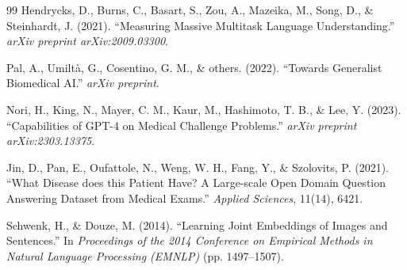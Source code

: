 \documentclass[11pt,a4paper]{article}
\begin{document}
\begin{thebibliography}{99}
Hendrycks, D., Burns, C., Basart, S., Zou, A., Mazeika, M., Song, D., \& Steinhardt, J. (2021). ``Measuring Massive Multitask Language Understanding.'' \textit{arXiv preprint arXiv:2009.03300}.

Pal, A., Umiltà, G., Cosentino, G. M., \& others. (2022). ``Towards Generalist Biomedical AI.'' \textit{arXiv preprint}.

Nori, H., King, N., Mayer, C. M., Kaur, M., Hashimoto, T. B., \& Lee, Y. (2023). ``Capabilities of GPT-4 on Medical Challenge Problems.'' \textit{arXiv preprint arXiv:2303.13375}.

Jin, D., Pan, E., Oufattole, N., Weng, W. H., Fang, Y., \& Szolovits, P. (2021). ``What Disease does this Patient Have? A Large-scale Open Domain Question Answering Dataset from Medical Exams.'' \textit{Applied Sciences}, 11(14), 6421.

Schwenk, H., \& Douze, M. (2014). ``Learning Joint Embeddings of Images and Sentences.'' In \textit{Proceedings of the 2014 Conference on Empirical Methods in Natural Language Processing (EMNLP)} (pp. 1497--1507).

\end{thebibliography}
\end{document}
